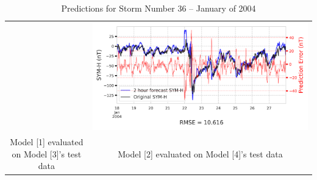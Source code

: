\documentclass[draft,sw]{agutexSI2019}
\begin{document}
\begin{table}
\begin{tabular}{cc}
&
\includegraphics[width=0.49\linewidth]{paper_plots/2h_swics_model_on_no_swics/2h_swics_model_on_no_swics_storm_36.png}
\\
Model [1] evaluated on Model [3]'s test data & Model [2] evaluated on Model [4]'s test data
\vspace*{12pt}
\\
\end{tabular}
\caption{Predictions for Storm Number 36 -- January of 2004}
\label{storm-36}
\end{table}
\end{document}
